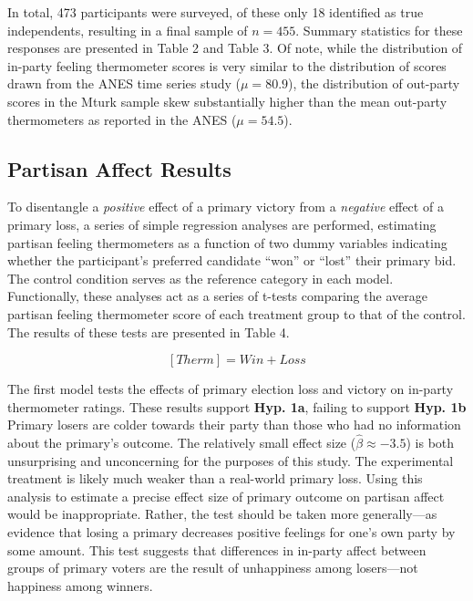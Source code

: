 \documentclass[
]{article}
\begin{document}
In total, 473 participants were surveyed, of these only 18 identified as true independents, resulting in a final sample of \(n = 455\). Summary statistics for these responses are presented in Table 2 and Table 3. Of note, while the distribution of in-party feeling thermometer scores is very similar to the distribution of scores drawn from the ANES time series study (\(\mu = 80.9\)), the distribution of out-party scores in the Mturk sample skew substantially higher than the mean out-party thermometers as reported in the ANES (\(\mu = 54.5\)).

\hypertarget{partisan-affect-results}{%
\subsection{Partisan Affect Results}\label{partisan-affect-results}}

To disentangle a \emph{positive} effect of a primary victory from a \emph{negative} effect of a primary loss, a series of simple regression analyses are performed, estimating partisan feeling thermometers as a function of two dummy variables indicating whether the participant's preferred candidate ``won'' or ``lost'' their primary bid. The control condition serves as the reference category in each model. Functionally, these analyses act as a series of t-tests comparing the average partisan feeling thermometer score of each treatment group to that of the control. The results of these tests are presented in Table 4.

\[
[Therm] = Win + Loss
\]

The first model tests the effects of primary election loss and victory on in-party thermometer ratings. These results support \textbf{Hyp. 1a}, failing to support \textbf{Hyp. 1b} Primary losers are colder towards their party than those who had no information about the primary's outcome. The relatively small effect size (\(\hat{\beta} \approx -3.5\)) is both unsurprising and unconcerning for the purposes of this study. The experimental treatment is likely much weaker than a real-world primary loss. Using this analysis to estimate a precise effect size of primary outcome on partisan affect would be inappropriate. Rather, the test should be taken more generally---as evidence that losing a primary decreases positive feelings for one's own party by some amount. This test suggests that differences in in-party affect between groups of primary voters are the result of unhappiness among losers---not happiness among winners.
\end{document}
